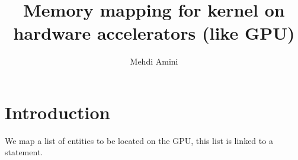 \documentclass{article}
\title{Memory mapping for kernel on hardware accelerators (like GPU)}
\author{Mehdi Amini}
\begin{document}
\maketitle

\section{Introduction}

{}

We map a list of entities to be located on the GPU, this list is linked to a 
statement.

{}
\end{document}
